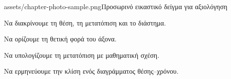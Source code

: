 \mainmatter
{}
{assets/chapter-photo-sample.png}{Προσωρινό εικαστικό δείγμα για αξιολόγηση}{%
\item Να διακρίνουμε τη θέση, τη μετατόπιση και το διάστημα.
\item Να ορίζουμε τη θετική φορά του άξονα.
\item Να υπολογίζουμε τη μετατόπιση με μαθηματική σχέση.
\item Να ερμηνεύουμε την κλίση ενός διαγράμματος θέσης–χρόνου.
}
